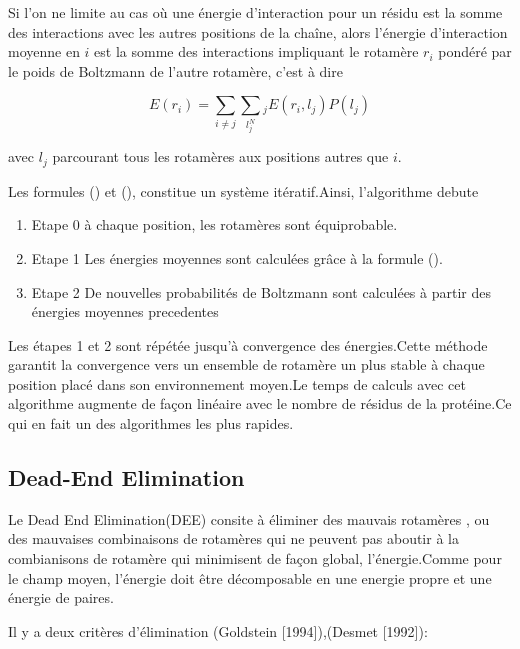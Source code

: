 Si l'on ne limite au cas où une énergie d'interaction pour un résidu est la somme des interactions avec les autres positions de la chaîne, alors l'énergie d'interaction moyenne en $i$ est la somme des interactions impliquant le rotamère $r_i$ pondéré par le poids de Boltzmann de l'autre rotamère, c'est à dire

\begin{equation}
E(r_i) = \sum_{i \neq j} \sum_l_j^N_j E(r_i,l_j)P(l_j)
\end{equation}  

avec $l_j$ parcourant tous les rotamères aux positions autres que $i$.

Les formules () et (), constitue un système itératif.Ainsi, l'algorithme debute


\begin{enumerate}
\item  Etape 0 à chaque position, les rotamères sont équiprobable.
\item  Etape 1 Les énergies moyennes sont calculées grâce à la formule ().
\item  Etape 2 De nouvelles probabilités de Boltzmann sont calculées à partir des énergies moyennes precedentes   
\end{enumerate}


Les étapes 1 et 2 sont répétée jusqu'à convergence des énergies.Cette méthode garantit la convergence vers un ensemble de rotamère un plus stable à chaque position placé dans son \og environnement moyen\fg .Le temps de calculs avec cet algorithme augmente  de façon linéaire avec le nombre de résidus de la protéine.Ce qui en fait un des algorithmes les plus rapides.

\subsection{Dead-End Elimination}

Le \og Dead End Elimination\fg (DEE)  consite à éliminer des mauvais rotamères , ou des mauvaises combinaisons de rotamères qui ne peuvent pas aboutir à la combianisons de rotamère qui minimisent de façon global, l'énergie.Comme pour le champ moyen, l'énergie doit être décomposable en une energie propre et une énergie de paires.

Il y a deux critères d'élimination (Goldstein [1994]),(Desmet [1992]):

